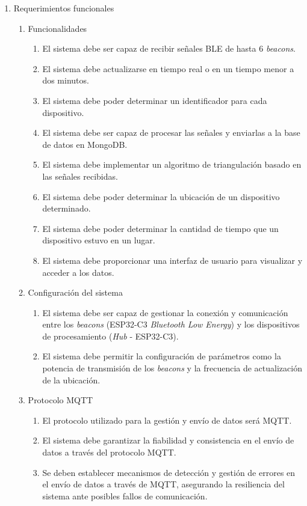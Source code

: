 \documentclass[
11pt, %
]{charter}
\begin{document}
\begin{enumerate}
	\item Requerimientos funcionales
		\begin{enumerate}
			\item Funcionalidades
				\begin{enumerate}
					\item El sistema debe ser capaz de recibir señales BLE de hasta 6 \textit{beacons}.
					\item El sistema debe actualizarse en tiempo real o en un tiempo menor a dos minutos.
					\item El sistema debe poder determinar un identificador para cada dispositivo.
					\item El sistema debe ser capaz de procesar las señales y enviarlas a la base de datos en MongoDB.
					\item El sistema debe implementar un algoritmo de triangulación basado en las señales recibidas.
					\item El sistema debe poder determinar la ubicación de un dispositivo determinado.
					\item El sistema debe poder determinar la cantidad de tiempo que un dispositivo estuvo en un lugar.
					\item El sistema debe proporcionar una interfaz de usuario para visualizar y acceder a los datos.
				\end{enumerate}
			\item Configuración del sistema
				\begin{enumerate}
					\item El sistema debe ser capaz de gestionar la conexión y comunicación entre los \textit{beacons} (ESP32-C3 \textit{Bluetooth Low Energy}) y los dispositivos de procesamiento (\textit{Hub} - ESP32-C3).
					\item El sistema debe permitir la configuración de parámetros como la potencia de transmisión de los \textit{beacons} y la frecuencia de actualización de la ubicación.
				\end{enumerate}
			\item Protocolo MQTT
				\begin{enumerate}
					\item El protocolo utilizado para la gestión y envío de datos será MQTT.
					\item El sistema debe garantizar la fiabilidad y consistencia en el envío de datos a través del protocolo MQTT.
					\item Se deben establecer mecanismos de detección y gestión de errores en el envío de datos a través de MQTT, asegurando la resiliencia del sistema ante posibles fallos de comunicación.

\end{enumerate}
\end{enumerate}
\end{enumerate}
\end{document}
